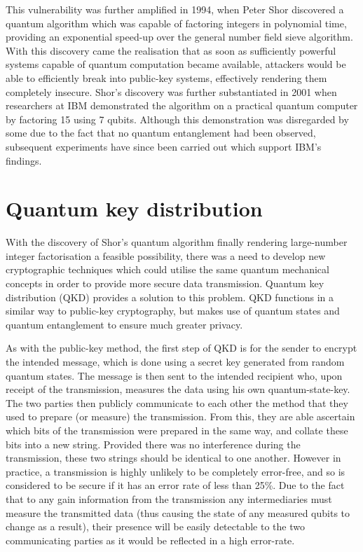 \documentclass[runningheads,a4paper]{llncs}
\begin{document}
This vulnerability was further amplified in 1994, when Peter Shor discovered a quantum algorithm which was capable of factoring integers in polynomial time, providing an exponential speed-up over the general number field sieve algorithm\cite{Shor:1994fk}. With this discovery came the realisation that as soon as sufficiently powerful systems capable of quantum computation became available, attackers would be able to efficiently break into public-key systems, effectively rendering them completely insecure. Shor's discovery was further substantiated in 2001 when researchers at IBM demonstrated the algorithm on a practical quantum computer by factoring 15 using 7 qubits\cite{Vandersypen:2001fk}. Although this demonstration was disregarded by some due to the fact that no quantum entanglement had been observed, subsequent experiments have since been carried out which support IBM's findings\cite{Lu:2007uq}.

\section{Quantum key distribution}

With the discovery of Shor's quantum algorithm finally rendering large-number integer factorisation a feasible possibility, there was a need to develop new cryptographic techniques which could utilise the same quantum mechanical concepts in order to provide more secure data transmission. Quantum key distribution (QKD) provides a solution to this problem. QKD functions in a similar way to public-key cryptography, but makes use of quantum states and quantum entanglement to ensure much greater privacy.

As with the public-key method, the first step of QKD is for the sender to encrypt the intended message, which is done using a secret key generated from random quantum states. The message is then sent to the intended recipient who, upon receipt of the transmission, measures the data using his own quantum-state-key. The two parties then publicly communicate to each other the method that they used to prepare (or measure) the transmission. From this, they are able ascertain which bits of the transmission were prepared in the same way, and collate these bits into a new string. Provided there was no interference during the transmission, these two strings should be identical to one another. However in practice, a transmission is highly unlikely to be completely error-free, and so is considered to be secure if it has an error rate of less than 25\%\cite{Steane:1997zr}. Due to the fact that to any gain information from the transmission any intermediaries must measure the transmitted data (thus causing the state of any measured qubits to change as a result),  their presence will be easily detectable to the two communicating parties as it would be reflected in a high error-rate.
\end{document}
